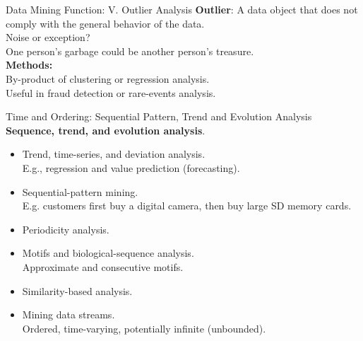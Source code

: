 \begin{frame}{Data Mining Function: V. Outlier Analysis}
	\textbf{Outlier}: A data object that does not comply with the general
	behavior of the data.\\[0.5cm]

	Noise or exception?\\
	One person's garbage could be another person's treasure.\\[0.5cm]

	\textbf{Methods:}\\
	By-product of clustering or regression analysis. \\
	Useful in fraud detection or rare-events analysis.
\end{frame}

\begin{frame}{Time and Ordering: Sequential Pattern, Trend and Evolution
		Analysis}
	\textbf{Sequence, trend, and evolution analysis}.\\
	\begin{itemize}
		\item Trend, time-series, and deviation analysis. \\
		      E.g., regression and value prediction (forecasting).
		\item Sequential-pattern mining.\\
		      E.g. customers first buy a digital camera, then buy large SD memory
		      cards.
		\item Periodicity analysis.
		\item Motifs and biological-sequence analysis.\\
		      Approximate and consecutive motifs.
		\item Similarity-based analysis.\\
		\item Mining data streams.\\
		      Ordered, time-varying, potentially infinite (unbounded).
	\end{itemize}
\end{frame}

